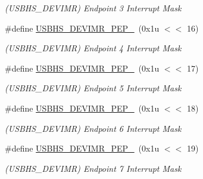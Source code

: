 \begin{DoxyCompactItemize}
\begin{DoxyCompactList}\small\item\em (U\+S\+B\+H\+S\+\_\+\+D\+E\+V\+I\+MR) Endpoint 3 Interrupt Mask \end{DoxyCompactList}\item 
\mbox{\label{group__SAME70__USBHS_ga42e100b990f972d7dc54483b1aa8462a}} 
\#define \mbox{\hyperlink{group__SAME70__USBHS_ga42e100b990f972d7dc54483b1aa8462a}{U\+S\+B\+H\+S\+\_\+\+D\+E\+V\+I\+M\+R\+\_\+\+P\+E\+P\+\_}}~(0x1u $<$$<$ 16)
\begin{DoxyCompactList}\small\item\em (U\+S\+B\+H\+S\+\_\+\+D\+E\+V\+I\+MR) Endpoint 4 Interrupt Mask \end{DoxyCompactList}\item 
\mbox{\label{group__SAME70__USBHS_ga0a689d341cf92739cd753c87e9d4c37a}} 
\#define \mbox{\hyperlink{group__SAME70__USBHS_ga0a689d341cf92739cd753c87e9d4c37a}{U\+S\+B\+H\+S\+\_\+\+D\+E\+V\+I\+M\+R\+\_\+\+P\+E\+P\+\_}}~(0x1u $<$$<$ 17)
\begin{DoxyCompactList}\small\item\em (U\+S\+B\+H\+S\+\_\+\+D\+E\+V\+I\+MR) Endpoint 5 Interrupt Mask \end{DoxyCompactList}\item 
\mbox{\label{group__SAME70__USBHS_gaf2daf6a675d98da260df1647c31a6649}} 
\#define \mbox{\hyperlink{group__SAME70__USBHS_gaf2daf6a675d98da260df1647c31a6649}{U\+S\+B\+H\+S\+\_\+\+D\+E\+V\+I\+M\+R\+\_\+\+P\+E\+P\+\_}}~(0x1u $<$$<$ 18)
\begin{DoxyCompactList}\small\item\em (U\+S\+B\+H\+S\+\_\+\+D\+E\+V\+I\+MR) Endpoint 6 Interrupt Mask \end{DoxyCompactList}\item 
\mbox{\label{group__SAME70__USBHS_gaa388c7e97ef7d81bc8080fb440273785}} 
\#define \mbox{\hyperlink{group__SAME70__USBHS_gaa388c7e97ef7d81bc8080fb440273785}{U\+S\+B\+H\+S\+\_\+\+D\+E\+V\+I\+M\+R\+\_\+\+P\+E\+P\+\_}}~(0x1u $<$$<$ 19)
\begin{DoxyCompactList}\small\item\em (U\+S\+B\+H\+S\+\_\+\+D\+E\+V\+I\+MR) Endpoint 7 Interrupt Mask \end{DoxyCompactList}\item 

\end{DoxyCompactItemize}
